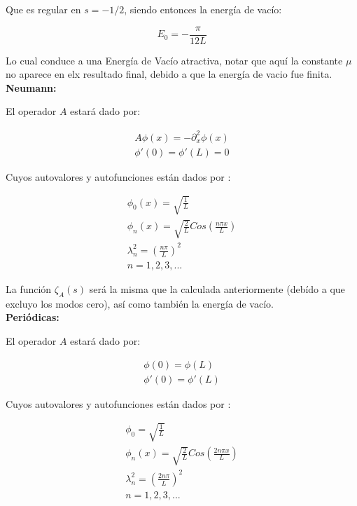 Que es regular en $s=-1/2$, siendo entonces la energía de vacío:

\begin{equation}
E _0 = - \frac{\pi}{12 L}
\end{equation}

Lo cual conduce a una Energía de Vacío atractiva, notar que aquí la constante $\mu$ no aparece en elx resultado final, debido a que la energía de vacio fue finita.\\

\textbf{Neumann:}

El operador $A$ estará dado por:

\begin{equation}
\begin{array}{c}
	A \phi (x) = - \partial _x ^2 \phi (x) \\
    \phi ' (0) = \phi ' (L) = 0 
\end{array}
\end{equation}



Cuyos autovalores y autofunciones están dados por  : 

\begin{equation}
\begin{array}{c}
	\phi _0 (x) = \sqrt{ \frac{1}{L} } \\
	\phi _n (x)  = \sqrt{\frac{2}{L}} Cos( \frac{n \pi x}{L} ) \\
	\lambda _n ^2 = \left( \frac{n \pi }{L} \right) ^2 \\
	n = 1,2,3, ...
\end{array}
\end{equation}

La función $\zeta _A (s)$ será la misma que la calculada anteriormente (debído a que excluyo los modos cero), así como también la energía de vacío. \\

\textbf{Periódicas:}

El operador $A$ estará dado por:

\begin{equation}
\begin{array}{c}
    \phi (0) = \phi (L)  \\ 
    \phi ' (0) = \phi ' (L)
\end{array}
\end{equation}

Cuyos autovalores y autofunciones están dados por  : 

\begin{equation}
\begin{array}{c}
	\phi _{0} = \sqrt{\frac{1}{L}} \\ 
	\phi _{n} (x) = \sqrt{\frac{2}{L}} Cos( \frac{2 n \pi x}{L} ) \\
	\lambda _n ^2 = \left( \frac{2 n \pi }{L} \right) ^2 \\
	n = 1,2,3, ...
\end{array}
\end{equation}

